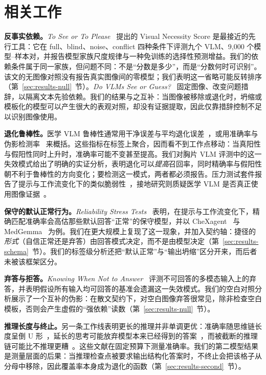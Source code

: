 \section{相关工作}
\label{sec:related}

\textbf{反事实依赖。}\emph{To See or To Please}~\citep{anon2026see} 提出的 Visual Necessity Score 是最接近的先行工具：它在 full、blind、noise、conflict 四种条件下评测九个 VLM、9,000 个模型--样本对，并报告模型家族尺度规律与一种免训练的选择性预测增益。我们的依赖条件属于同一家族，但问题不同：不是``分数是多少''，而是``分数何时可识别''。该文的无图像对照没有报告真实图像间的零模型；我们表明这一省略可能反转排序（第~\ref{sec:results-null}~节）。\emph{Do VLMs See or Guess?}~\citep{anon2026guess} 固定图像、改变问题措辞，以隔离文本先验依赖。我们的结果与之互补：当图像被移除或退化时，坍缩或模板化的模型可以产生很大的表观对照，却没有证据提取，因此仅靠措辞控制不足以识别图像使用。

\textbf{退化鲁棒性。}医学 VLM 鲁棒性通常用干净误差与平均退化误差~\citep{anon2025corruption}，或用准确率与伪影检测率~\citep{cheng2025robustness} 来概括。这些指标在标签上聚合，因而看不到工作点移动：当真阳性与假阳性同时上升时，准确率可能不变甚至提高。我们对胸片 VLM 评测中的这一失效模式给出了明确的实证分析，表明退化可以\emph{提高}召回率，同时精确率与假阳性朝不利于鲁棒性的方向变化；要检测这一模式，两者都必须报告。压力测试套件报告了提示与工作流变化下的类似脆弱性~\citep{gu2025illusion}，接地研究则质疑医学 VLM 是否真正使用图像证据~\citep{felizzi2025grounded}。

\textbf{保守的默认正常行为。}\emph{Reliability Stress Tests}~\citep{anon2026stress} 表明，在提示与工作流变化下，精确匹配准确率会高估那些默认回答``正常''的保守模型，并以 CheXagent~\citep{chen2024chexagent} 与 MedGemma~\citep{sellergren2025medgemma} 为例。我们在更大规模上复现了这一现象，并加入契约轴：捷径的\emph{形式}（自信正常还是弃答）由回答模式决定，而不是由模型决定（第~\ref{sec:results-schema}~节）。我们的标签级分析还把``默认正常''与``输出坍缩''区分开来，而后者未被该框架区分。

\textbf{弃答与拒答。}\emph{Knowing When Not to Answer}~\citep{anon2026knowing} 评测不可回答的多模态输入上的弃答，并表明假设所有输入均可回答的基准会遗漏这一失效模式。我们的空白对照分析展示了一个互补的伪影：在散文契约下，对空白图像弃答很常见，除非检查空白模板，否则会产生虚假的``强依赖''读数（第~\ref{sec:results-null}~节）。

\textbf{推理长度与终止。}另一条工作线表明更长的推理并非单调更优：准确率随思维链长度呈倒 U 形~\citep{wu2026whenmore}，延长的思考可能放弃模型本来已经得到的答案~\citep{zhou2026overthinking}，而被截断的推理链可能比不推理更糟~\citep{su2026broken}。这些文献在固定预算下测量准确率。我们的第二模型结果是测量层面的后果：当推理检查点被要求输出结构化答案时，不终止会把该格子从分母中移除，因此覆盖率本身成为退化的函数（第~\ref{sec:results-second}~节）。

